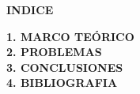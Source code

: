 \begin{titlepage}%
	\begin{center}
	 {\huge \textbf{INDICE}}\\
   \begin{flushleft}
   \vspace{8mm}
	{\Large {\textbf{1. MARCO TEÓRICO}}}\\
	\vspace{8mm}		
	{\Large {\textbf{2. PROBLEMAS}}}\\	
	\vspace{8mm}	
	{\Large {\textbf{3. CONCLUSIONES}}}\\
	\vspace{8mm}
	{\Large {\textbf{4. BIBLIOGRAFIA}}}
	\vspace{8mm}	
	\end{flushleft}
	\end{center}
\end{titlepage}